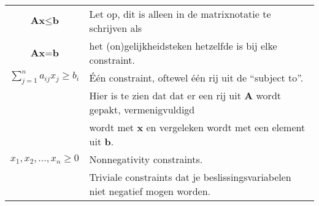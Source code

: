 \documentclass[10pt,a4paper]{article}
\begin{document}
\begin{tabular}{|c|l|}
$\textbf{Ax} \leq \textbf{b}$ & Let op, dit is alleen in de matrixnotatie te schrijven als \\
$\textbf{Ax} = \textbf{b}$ & het (on)gelijkheidsteken hetzelfde is bij elke constraint.\\
\hline
$\displaystyle\sum\limits_{j=1}^n a_{ij}x_j \ge b_i$ & Één constraint, oftewel één rij uit de ``subject to''.\\
 & Hier is te zien dat dat er een rij uit $\textbf{A}$ wordt gepakt, vermenigvuldigd \\ &  wordt met $\textbf{x}$ en vergeleken wordt met een element uit $\textbf{b}$. \\
\hline
$x_1, x_2, ..., x_n \geq 0$ & Nonnegativity constraints. \\ & Triviale constraints dat je beslissingsvariabelen niet negatief mogen worden.\\
\hline
\end{tabular}

\newpage
\end{document}
